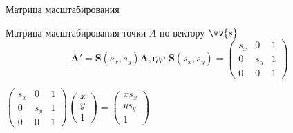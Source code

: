 \documentclass[10pt]{beamer}
\begin{document}
\begin{frame}{Матрица масштабирования}
	\begin{block}{Матрица масштабирования точки $A$ по вектору $\vv{s}$ }
		$$
			\textbf{A}' =\textbf{S}(s_x,s_y) \textbf{A}, \text{где } \textbf{S}(s_x,s_y) =
			\begin{pmatrix}
				s_x&0&1\\
				0&s_y&1\\
				0&0&1
			\end{pmatrix} 
		$$
	\end{block}
	$
		\begin{pmatrix}
			s_x&0&1\\
			0&s_y&1\\
			0&0&1
		\end{pmatrix}
		\begin{pmatrix}
			x\\
			y\\
			1
		\end{pmatrix}
		=
		\begin{pmatrix}
			xs_x\\
			ys_y\\
			1
		\end{pmatrix}
	$
\end{frame}
\end{document}
